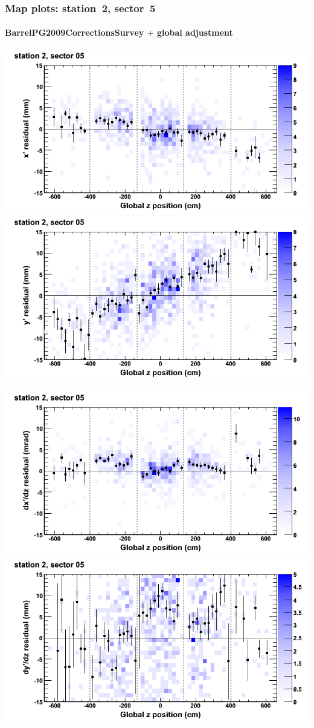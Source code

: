 \documentclass[compress]{beamer}
\begin{document}
\begin{frame}
\frametitle{Map plots: station~2, sector~5}
\framesubtitle{BarrelPG2009CorrectionsSurvey $+$ global adjustment}
\includegraphics[width=0.5\linewidth]{mapplots_re01/DTvsz_st2sec05_x.png}
\includegraphics[width=0.5\linewidth]{mapplots_re01/DTvsz_st2sec05_y.png}

\includegraphics[width=0.5\linewidth]{mapplots_re01/DTvsz_st2sec05_dxdz.png}
\includegraphics[width=0.5\linewidth]{mapplots_re01/DTvsz_st2sec05_dydz.png}
\end{frame}
\end{document}
